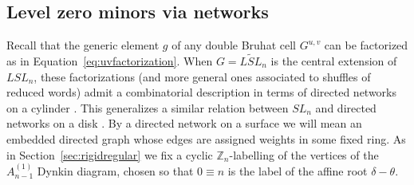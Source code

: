 \documentclass[12pt]{amsart}
\newcommand{\ZZ}{\mathbb{Z}}
\theoremstyle{remark}
\numberwithin{equation}{section}
\numberwithin{figure}{section}
\begin{document}
\subsection{Level zero minors via networks}
\label{sec:networks}
Recall that the generic element $g$ of any double Bruhat cell $G^{u,v}$ can be factorized as in Equation~\eqref{eq:uvfactorization}.
When $G = \widetilde{LSL}_n$ is the central extension of $LSL_n$, these factorizations (and more general ones associated to shuffles of reduced words) admit a combinatorial description in terms of directed networks on a cylinder \cite{GSV12,FM14}.
This generalizes a similar relation between $SL_n$ and directed networks on a disk \cite{FZ99}.
By a directed network on a surface we will mean an embedded directed graph whose edges are assigned weights in some fixed ring.
As in Section~\ref{sec:rigidregular} we fix a cyclic $\ZZ_n$-labelling of the vertices of the $A_{n-1}^{\!(1)}$ Dynkin diagram, chosen so that $0 \equiv n$ is the label of the affine root $\delta - \theta$.
\end{document}
